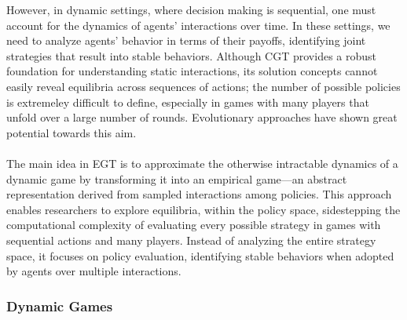 \begin{flushleft}
    However, in dynamic settings, where decision making is sequential, one must account for the dynamics of agents' interactions over time. In these settings, we need to analyze agents' behavior in terms of their payoffs, identifying joint strategies that result into stable behaviors. Although CGT provides a robust foundation for understanding static interactions, its solution concepts cannot easily reveal equilibria across sequences of actions; the number of possible policies is extremeley difficult to define, especially in games with many players that unfold over a large number of rounds. Evolutionary approaches have shown great potential towards this aim.\\~\\

    The main idea in EGT is to approximate the otherwise intractable dynamics of a dynamic game by transforming it into an empirical game—an abstract representation derived from sampled interactions among policies. This approach enables researchers to explore equilibria, within the policy space, sidestepping the computational complexity of evaluating every possible strategy in games with sequential actions and many players. Instead of analyzing the entire strategy space, it focuses on policy evaluation, identifying stable behaviors when adopted by agents over multiple interactions.
    
\end{flushleft}

\subsubsection{Dynamic Games}

